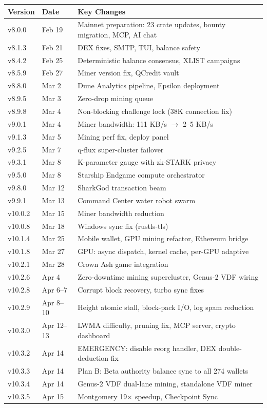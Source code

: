 \documentclass[12pt,a4paper]{article}
\begin{document}
\begin{longtable}{@{}llp{8cm}@{}}
\toprule
\textbf{Version} & \textbf{Date} & \textbf{Key Changes} \\
\midrule
\endhead
v8.0.0 & Feb 19 & Mainnet preparation: 23 crate updates, bounty migration, MCP, AI chat \\
v8.1.3 & Feb 21 & DEX fixes, SMTP, TUI, balance safety \\
v8.4.2 & Feb 25 & Deterministic balance consensus, XLIST campaigns \\
v8.5.9 & Feb 27 & Miner version fix, QCredit vault \\
v8.8.0 & Mar 2 & Dune Analytics pipeline, Epsilon deployment \\
v8.9.5 & Mar 3 & Zero-drop mining queue \\
v8.9.8 & Mar 4 & Non-blocking challenge lock (38K connection fix) \\
v9.0.1 & Mar 4 & Miner bandwidth: 111 KB/s $\to$ 2--5 KB/s \\
v9.1.3 & Mar 5 & Mining perf fix, deploy panel \\
v9.2.5 & Mar 7 & q-flux super-cluster failover \\
v9.3.1 & Mar 8 & K-parameter gauge with zk-STARK privacy \\
v9.5.0 & Mar 8 & Starship Endgame compute orchestrator \\
v9.8.0 & Mar 12 & SharkGod transaction beam \\
v9.9.1 & Mar 13 & Command Center water robot swarm \\
v10.0.2 & Mar 15 & Miner bandwidth reduction \\
v10.0.8 & Mar 18 & Windows sync fix (rustls-tls) \\
v10.1.4 & Mar 25 & Mobile wallet, GPU mining refactor, Ethereum bridge \\
v10.1.8 & Mar 27 & GPU: async dispatch, kernel cache, per-GPU adaptive \\
v10.2.1 & Mar 28 & Crown Ash game integration \\
v10.2.6 & Apr 4 & Zero-downtime mining supercluster, Genus-2 VDF wiring \\
v10.2.8 & Apr 6--7 & Corrupt block recovery, turbo sync fixes \\
v10.2.9 & Apr 8--10 & Height atomic stall, block-pack I/O, log spam reduction \\
v10.3.0 & Apr 12--13 & LWMA difficulty, pruning fix, MCP server, crypto dashboard \\
v10.3.2 & Apr 14 & EMERGENCY: disable reorg handler, DEX double-deduction fix \\
v10.3.3 & Apr 14 & Plan B: Beta authority balance sync to all 274 wallets \\
v10.3.4 & Apr 14 & Genus-2 VDF dual-lane mining, standalone VDF miner \\
v10.3.5 & Apr 15 & Montgomery 19$\times$ speedup, Checkpoint Sync \\
\bottomrule
\end{longtable}
\end{document}
